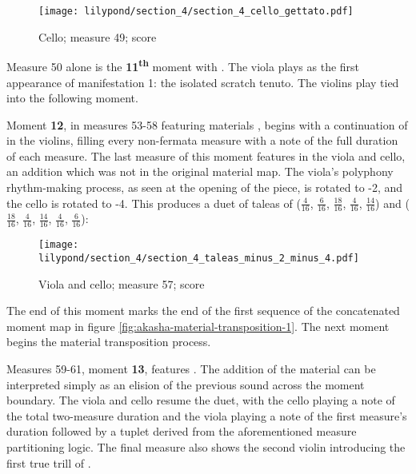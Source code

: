 \setcounter{figure}{27}
\begin{figure}[H]
    \texttt{[image: lilypond/section\_4/section\_4\_cello\_gettato.pdf]}
    \caption{Cello; measure 49; score}
    \label{fig:section-4-gettato-minus-12}
\end{figure}

Measure 50 alone is the \textbf{11\textsuperscript{th}} moment with . The viola plays  as the first appearance of manifestation 1: the isolated scratch tenuto. The violins play  tied into the following moment.

Moment \textbf{12}, in measures 53-58 featuring materials , begins with a continuation of  in the violins, filling every non-fermata measure with a note of the full duration of each measure. The last measure of this moment features  in the viola and cello, an addition which was not in the original material map. The viola's polyphony rhythm-making process, as seen at the opening of the piece, is rotated to -2, and the cello is rotated to -4. This produces a duet of taleas of ($\frac{4}{16}$, $\frac{6}{16}$, $\frac{18}{16}$, $\frac{4}{16}$, $\frac{14}{16}$) and ($\frac{18}{16}$, $\frac{4}{16}$, $\frac{14}{16}$, $\frac{4}{16}$, $\frac{6}{16}$):

\setcounter{figure}{28}
\begin{figure}[H]
    \texttt{[image: lilypond/section\_4/section\_4\_taleas\_minus\_2\_minus\_4.pdf]}
    \caption{Viola and cello; measure 57; score}
    \label{fig:section-4-talea-minus-2-minus-4}
\end{figure}

The end of this moment marks the end of the first sequence of the concatenated moment map in figure \vref{fig:akasha-material-transposition-1}. The next moment begins the material transposition process.

Measures 59-61, moment \textbf{13}, features . The addition of the  material can be interpreted simply as an elision of the previous sound across the moment boundary. The viola and cello resume the  duet, with the cello playing a note of the total two-measure duration and the viola playing a note of the first measure's duration followed by a tuplet derived from the aforementioned measure partitioning logic. The final measure also shows the second violin introducing the first true trill of .

